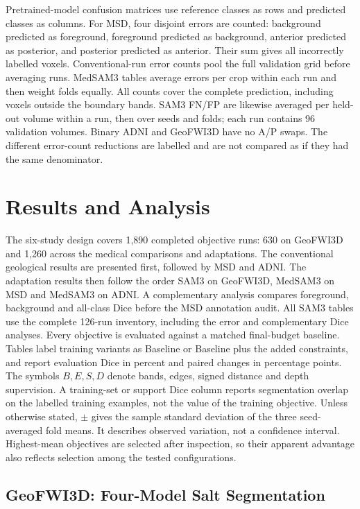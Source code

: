 \documentclass[12pt,a4paper]{article}
\begin{document}
Pretrained-model confusion matrices use reference classes as rows and
predicted classes as columns. For MSD, four disjoint errors are counted: background
predicted as foreground, foreground predicted as background, anterior
predicted as posterior, and posterior predicted as anterior. Their
sum gives all incorrectly labelled voxels. Conventional-run error counts pool the full validation grid before
averaging runs. MedSAM3 tables average errors per crop within each run
and then weight folds equally. All counts cover the complete prediction,
including voxels outside the boundary bands. SAM3 FN/FP are likewise
averaged per held-out volume within a run, then over seeds and folds;
each run contains 96 validation volumes. Binary ADNI and GeoFWI3D have
no A/P swaps. The different error-count reductions are labelled and are not compared
as if they had the same denominator.

\clearpage

\section{Results and Analysis}
\label{sec:results}

The six-study design covers 1,890 completed objective runs: 630 on
GeoFWI3D and 1,260 across the medical comparisons and adaptations.
The conventional geological results are presented first, followed by
MSD and ADNI. The adaptation results then follow the order SAM3 on
GeoFWI3D, MedSAM3 on MSD and MedSAM3 on ADNI. A complementary analysis compares
foreground, background and all-class Dice before the MSD annotation
audit. All SAM3 tables use the complete 126-run inventory, including
the error and complementary Dice analyses. Every objective is evaluated
against a matched final-budget baseline.
Tables label training variants as Baseline or Baseline plus the added
constraints, and report evaluation Dice in percent and paired changes
in percentage points. The symbols $B,E,S,D$ denote bands, edges,
signed distance and depth supervision. A training-set or support Dice
column reports segmentation overlap on the labelled training examples,
not the value of the training objective.
Unless otherwise stated, $\pm$ gives the sample standard deviation of
the three seed-averaged fold means. It describes observed variation,
not a confidence interval. Highest-mean objectives are selected after
inspection, so their apparent advantage also reflects selection among
the tested configurations.

\subsection{GeoFWI3D: Four-Model Salt Segmentation}
\label{sec:geo-results}
\end{document}
